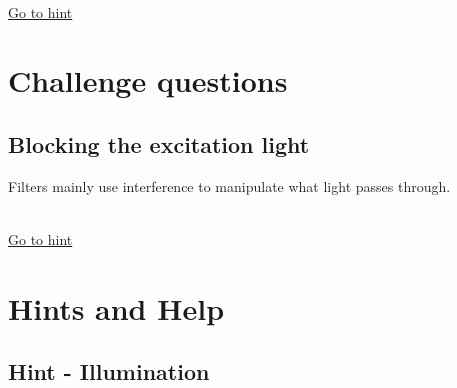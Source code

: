 \documentclass[a4paper]{report}
\begin{document}
    
	\\
	\hyperlink{hintTo-imaging}{Go to hint}
	
	
	\section{Challenge questions}
	\hypertarget{hintBack-challenge}{}
	
	\subsection{Blocking the excitation light}
    Filters mainly use interference to manipulate what light passes through. 
    
	\\
	\hyperlink{hintTo-challenge}{Go to hint}
	
	
	\clearpage
    
	\section{Hints and Help}
	
    \subsection{Hint - Illumination}
	\hypertarget{hintTo-illumination}{}
	
\end{document}
